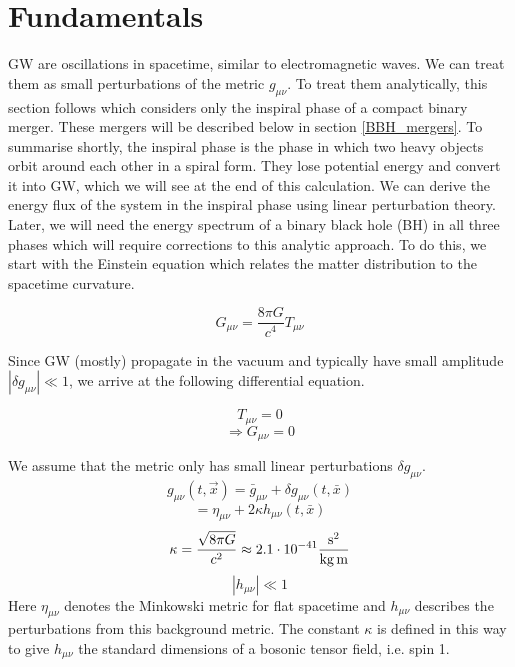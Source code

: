 \section{Fundamentals}
\label{gw_fundamentals}
GW are oscillations in spacetime, similar to electromagnetic waves. We can treat them as small perturbations of the metric $g_{\mu\nu}$. To treat them analytically, this section follows \cite{van_holten_gravitational_2019} which considers only the inspiral phase of a compact binary merger. These mergers will be described below in section \ref{BBH_mergers}. To summarise shortly, the inspiral phase is the phase in which two heavy objects orbit around each other in a spiral form. They lose potential energy and convert it into GW, which we will see at the end of this calculation. 
We can derive the energy flux of the system in the inspiral phase using linear perturbation theory. Later, we will need the energy spectrum of a binary black hole (BH) in all three phases which will require corrections to this analytic approach. To do this, we start with the Einstein equation which relates the matter distribution to the spacetime curvature.

\begin{equation}
    G_{\mu\nu}= \frac{8\pi G}{c^4} T_{\mu\nu}
\end{equation}

Since GW (mostly) propagate in the vacuum and typically have small amplitude $|\delta g_{\mu\nu}| \ll 1$, we arrive at the following differential equation.

\begin{equation}
    T_{\mu\nu} = 0
\end{equation}
\begin{equation}
    \Rightarrow G_{\mu\nu} = 0
\end{equation}


We assume that the metric only has small linear perturbations $\delta g_{\mu\nu}$. 
\begin{equation}
    g_{\mu \nu}(t, \vec{x}) = \bar{g}_{\mu \nu} + \delta g_{\mu \nu}(t, \bar{x})
\end{equation}
\begin{equation}
   = \eta_{\mu \nu} + 2\kappa h_{\mu \nu}(t, \bar{x})
\end{equation}
\begin{equation}
    \kappa = \frac{\sqrt{8\pi G}}{c^2} \approx 2.1 \cdot 10^{-41}\frac{\rm{s}^2}{\rm{kg}\,\rm{ m}}
\end{equation}
\begin{equation}
    |h_{\mu \nu}| \ll 1
\end{equation}
Here $\eta_{ \mu \nu}$ denotes the Minkowski metric for flat spacetime and $h_{\mu\nu}$ describes the perturbations from this background metric. The constant $\kappa$ is defined in this way to give $h_{\mu\nu}$ the standard dimensions of a bosonic tensor field, i.e. spin 1. 

